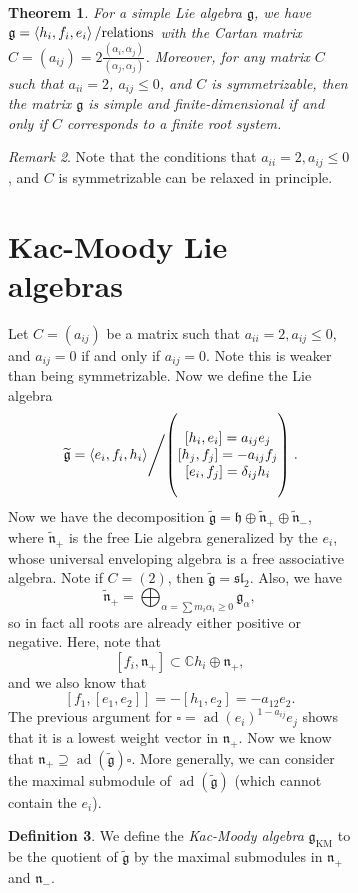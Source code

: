 \documentclass[leqno, openany]{memoir}
\newtheorem{thm}{Theorem}[section]
\theoremstyle{definition}
\newtheorem{defn}[thm]{Definition}
\theoremstyle{remark}
\newtheorem{rmk}[thm]{Remark}
\theoremstyle{plain}
\theoremstyle{definition}
\theoremstyle{remark}
\newcommand{\C}{\mathbb{C}}
\newcommand{\mf}[1]{\mathfrak{#1}}
\newcommand{\mr}[1]{\mathrm{#1}}
\newcommand{\wtl}[1]{\widetilde{#1}}
\DeclareMathOperator{\ad}{ad}
\begin{document}
\begin{figure}[H]
\begin{figure}[H]
\begin{thm} For a simple Lie algebra $\mf{g}$, we have $\mf{g} = \ev{h_i, f_i,
    e_i} / \text{relations}$ with the Cartan matrix $C = (a_{ij}) = 2
    \frac{(\alpha_i, \alpha_j)}{(\alpha_j, \alpha_j)}$. Moreover, for any
    matrix $C$ such that $a_{ii} = 2$, $a_{ij} \leq 0$, and $C$ is
    symmetrizable, then the matrix $\mf{g}$ is simple and finite-dimensional if
    and only if $C$ corresponds to a finite root system.  \end{thm}

\begin{rmk} Note that the conditions that $a_{ii} = 2, a_{ij} \leq 0$, and $C$
is symmetrizable can be relaxed in principle.  \end{rmk}

\section{Kac-Moody Lie algebras}%

Let $C = (a_{ij})$ be a matrix such that $a_{ii} = 2, a_{ij} \leq 0$, and
$a_{ij} = 0$ if and only if $a_{ij} = 0$. Note this is weaker than being
symmetrizable. Now we define the Lie algebra \[ \left. \wtl{\mf{g}} = \ev{e_i,
f_i, h_i} \middle/ \qty( \Vectorstack{ {[h_i, e_i] = a_{ij} e_j} {[h_j, f_j] =
-a_{ij} f_j} {[e_i, f_j] = \delta_{ij} h_i} } ) \right. . \] Now we have the
decomposition $\wtl{\mf{g}} = \mf{h} \oplus \wtl{\mf{n}}_+ \oplus
\wtl{\mf{n}}_-$, where $\wtl{\mf{n}}_+$ is the free Lie algebra generalized by
the $e_i$, whose universal enveloping algebra is a free associative algebra.
Note if $C = (2)$, then $\wtl{\mf{g}} = \mf{sl}_2$. Also, we have \[
    \wtl{\mf{n}}_+ = \bigoplus_{\alpha = \sum m_i \alpha_i \geq 0}
    \mf{g}_{\alpha}, \] so in fact all roots are already either positive or
    negative. Here, note that \[ [f_i, \mf{n}_+] \subset \C h_i \oplus
    \mf{n}_+, \] and we also know that \[ [f_1, [e_1, e_2]] = -[h_1, e_2] =
-a_{12} e_2. \] The previous argument for $\square = {\ad(e_i)}^{1-a_{ij}} e_j$
shows that it is a lowest weight vector in $\mf{n}_+$. Now we know that
$\mf{n}_+ \supseteq \ad(\wtl{\mf{g}}) \square$. More generally, we can consider
the maximal submodule of $\ad(\wtl{\mf{g}})$ (which cannot contain the $e_i$). 

\begin{defn} We define the \textit{Kac-Moody algebra} $\mf{g}_{\mr{KM}}$ to be
the quotient of $\wtl{\mf{g}}$ by the maximal submodules in $\mf{n}_+$ and
$\mf{n}_-$.  \end{defn}


\end{figure}
\end{figure}
\end{document}

